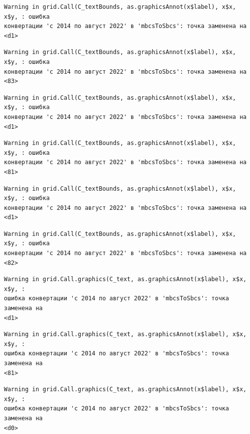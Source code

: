 \documentclass[
  letterpaper,
  DIV=11,
  numbers=noendperiod]{scrreprt}
\begin{document}
\begin{verbatim}
Warning in grid.Call(C_textBounds, as.graphicsAnnot(x$label), x$x, x$y, : ошибка
конвертации 'с 2014 по август 2022' в 'mbcsToSbcs': точка заменена на <d1>
\end{verbatim}

\begin{verbatim}
Warning in grid.Call(C_textBounds, as.graphicsAnnot(x$label), x$x, x$y, : ошибка
конвертации 'с 2014 по август 2022' в 'mbcsToSbcs': точка заменена на <83>
\end{verbatim}

\begin{verbatim}
Warning in grid.Call(C_textBounds, as.graphicsAnnot(x$label), x$x, x$y, : ошибка
конвертации 'с 2014 по август 2022' в 'mbcsToSbcs': точка заменена на <d1>
\end{verbatim}

\begin{verbatim}
Warning in grid.Call(C_textBounds, as.graphicsAnnot(x$label), x$x, x$y, : ошибка
конвертации 'с 2014 по август 2022' в 'mbcsToSbcs': точка заменена на <81>
\end{verbatim}

\begin{verbatim}
Warning in grid.Call(C_textBounds, as.graphicsAnnot(x$label), x$x, x$y, : ошибка
конвертации 'с 2014 по август 2022' в 'mbcsToSbcs': точка заменена на <d1>
\end{verbatim}

\begin{verbatim}
Warning in grid.Call(C_textBounds, as.graphicsAnnot(x$label), x$x, x$y, : ошибка
конвертации 'с 2014 по август 2022' в 'mbcsToSbcs': точка заменена на <82>
\end{verbatim}

\begin{verbatim}
Warning in grid.Call.graphics(C_text, as.graphicsAnnot(x$label), x$x, x$y, :
ошибка конвертации 'с 2014 по август 2022' в 'mbcsToSbcs': точка заменена на
<d1>
\end{verbatim}

\begin{verbatim}
Warning in grid.Call.graphics(C_text, as.graphicsAnnot(x$label), x$x, x$y, :
ошибка конвертации 'с 2014 по август 2022' в 'mbcsToSbcs': точка заменена на
<81>
\end{verbatim}

\begin{verbatim}
Warning in grid.Call.graphics(C_text, as.graphicsAnnot(x$label), x$x, x$y, :
ошибка конвертации 'с 2014 по август 2022' в 'mbcsToSbcs': точка заменена на
<d0>
\end{verbatim}
\end{document}
